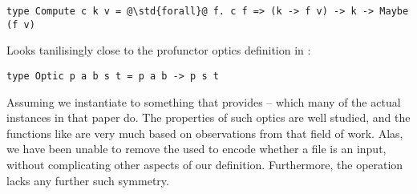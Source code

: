 \begin{verbatim}
type Compute c k v = @\std{forall}@ f. c f => (k -> f v) -> k -> Maybe (f v)
\end{verbatim}

Looks tanilisingly close to the profunctor optics definition in \cite{gibbons-profunctor-optics}:

\begin{verbatim}
type Optic p a b s t = p a b -> p s t
\end{verbatim}

Assuming we instantiate  to something that provides  -- which many of the actual instances in that paper do. The properties of such optics are well studied, and the functions like  are very much based on observations from that field of work. Alas, we have been unable to remove the  used to encode whether a file is an input, without complicating other aspects of our definition. Furthermore, the  operation lacks any further such symmetry.
